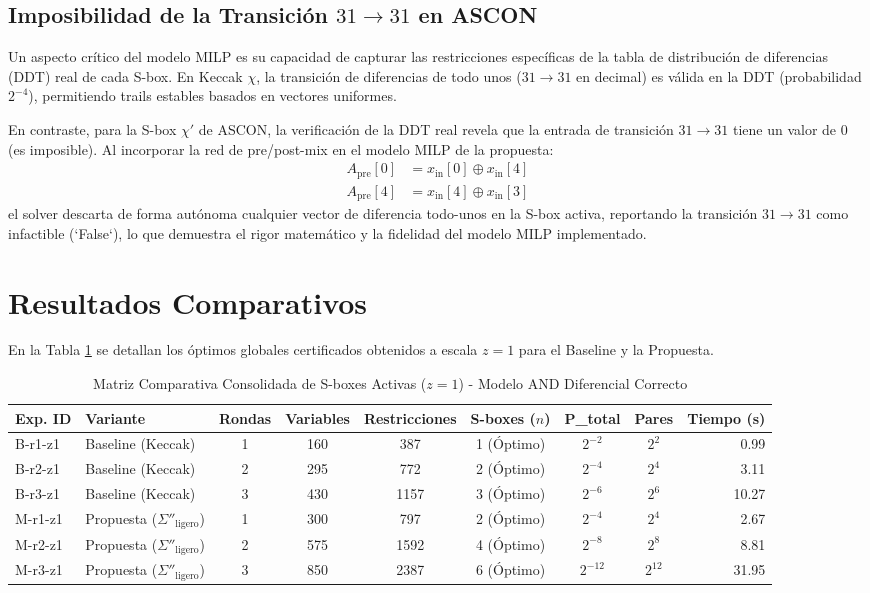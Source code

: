 \documentclass[journal,compsoc]{IEEEtran}
\begin{document}
\subsection{Imposibilidad de la Transición $31 \rightarrow 31$ en ASCON}
Un aspecto crítico del modelo MILP es su capacidad de capturar las restricciones específicas de la tabla de distribución de diferencias (DDT) real de cada S-box. En Keccak $\chi$, la transición de diferencias de todo unos ($31 \rightarrow 31$ en decimal) es válida en la DDT (probabilidad $2^{-4}$), permitiendo trails estables basados en vectores uniformes. 

En contraste, para la S-box $\chi'$ de ASCON, la verificación de la DDT real revela que la entrada de transición $31 \rightarrow 31$ tiene un valor de $0$ (es imposible). Al incorporar la red de pre/post-mix en el modelo MILP de la propuesta:
\begin{align}
    A_{\text{pre}}[0] &= x_{\text{in}}[0] \oplus x_{\text{in}}[4] \\
    A_{\text{pre}}[4] &= x_{\text{in}}[4] \oplus x_{\text{in}}[3]
\end{align}
el solver descarta de forma autónoma cualquier vector de diferencia todo-unos en la S-box activa, reportando la transición $31 \rightarrow 31$ como infactible (`False`), lo que demuestra el rigor matemático y la fidelidad del modelo MILP implementado.

\section{Resultados Comparativos}
En la Tabla \ref{tab:consolidado} se detallan los óptimos globales certificados obtenidos a escala $z=1$ para el Baseline y la Propuesta.

\begin{table}[t]
\centering
\caption{Matriz Comparativa Consolidada de S-boxes Activas ($z=1$) - Modelo AND Diferencial Correcto}
\label{tab:consolidado}
\begin{tabular}{llccccccr}
\toprule
\textbf{Exp. ID} & \textbf{Variante} & \textbf{Rondas} & \textbf{Variables} & \textbf{Restricciones} & \textbf{S-boxes ($n$)} & \textbf{P\_total} & \textbf{Pares} & \textbf{Tiempo (s)} \\
\midrule
B-r1-z1 & Baseline (Keccak) & 1 & 160 & 387 & 1 (Óptimo) & $2^{-2}$ & $2^2$ & 0.99 \\
B-r2-z1 & Baseline (Keccak) & 2 & 295 & 772 & 2 (Óptimo) & $2^{-4}$ & $2^4$ & 3.11 \\
B-r3-z1 & Baseline (Keccak) & 3 & 430 & 1157 & 3 (Óptimo) & $2^{-6}$ & $2^6$ & 10.27 \\
\midrule
M-r1-z1 & Propuesta ($\Sigma''_{\text{ligero}}$) & 1 & 300 & 797 & 2 (Óptimo) & $2^{-4}$ & $2^4$ & 2.67 \\
M-r2-z1 & Propuesta ($\Sigma''_{\text{ligero}}$) & 2 & 575 & 1592 & 4 (Óptimo) & $2^{-8}$ & $2^8$ & 8.81 \\
M-r3-z1 & Propuesta ($\Sigma''_{\text{ligero}}$) & 3 & 850 & 2387 & 6 (Óptimo) & $2^{-12}$ & $2^{12}$ & 31.95 \\
\bottomrule
\end{tabular}
\end{table}
\end{document}
